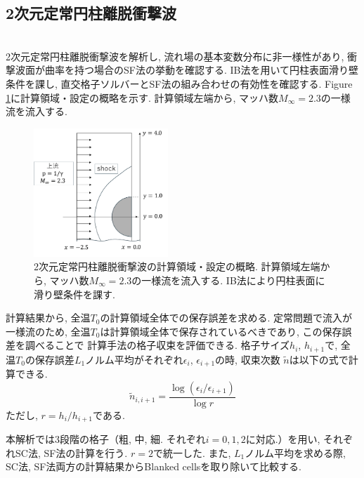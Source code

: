 \documentclass[a4j]{jarticle}
\begin{document}
\subsection{2次元定常円柱離脱衝撃波}\label{subsec:2Dcirc}
\mbox{}\\[-3.0ex]

2次元定常円柱離脱衝撃波を解析し, 流れ場の基本変数分布に非一様性があり, 衝撃波面が曲率を持つ場合のSF法の挙動を確認する.
IB法を用いて円柱表面滑り壁条件を課し, 直交格子ソルバーとSF法の組み合わせの有効性を確認する.
Figure \ref{fig:2Dcolumnsitu}に計算領域・設定の概略を示す.
計算領域左端から, マッハ数$M_\infty=2.3$の一様流を流入する.
\begin{figure}[h]
    \begin{center}
        \includegraphics[width=0.45\textwidth]{2Dcolumnsitu.pdf}
    \end{center}
    \caption{2次元定常円柱離脱衝撃波の計算領域・設定の概略.
    計算領域左端から, マッハ数$M_\infty=2.3$の一様流を流入する.
    IB法により円柱表面に滑り壁条件を課す.}
    \label{fig:2Dcolumnsitu}
\end{figure}

計算結果から, 全温$T_0$の計算領域全体での保存誤差を求める.
定常問題で流入が一様流のため, 全温$T_0$は計算領域全体で保存されているべきであり, この保存誤差を調べることで
計算手法の格子収束を評価できる. 
格子サイズ$h_i$, $h_{i+1}$で, 全温$T_0$の保存誤差$L_1$ノルム平均がそれぞれ$\epsilon_i$, $\epsilon_{i+1}$の時,
収束次数 $\tilde{n}$は以下の式で計算できる.
\begin{equation}
  \tilde{n}_{i,i+1} = \frac{\log (\epsilon_i/\epsilon_{i+1})}{\log r}
    \label{eq:order_of_conv}
\end{equation}
ただし, $r = h_i/h_{i+1}$である.

本解析では3段階の格子（粗, 中, 細. それぞれ$i=0,1,2$に対応.）を用い, それぞれSC法, SF法の計算を行う.
$r=2$で統一した.
また, $L_1$ノルム平均を求める際, SC法, SF法両方の計算結果からBlanked cellsを取り除いて比較する.
\end{document}
